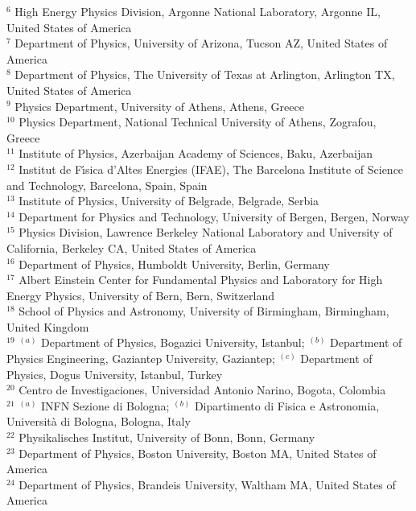 \begin{flushleft}
$^{6}$ High Energy Physics Division, Argonne National Laboratory, Argonne IL, United States of America\\
$^{7}$ Department of Physics, University of Arizona, Tucson AZ, United States of America\\
$^{8}$ Department of Physics, The University of Texas at Arlington, Arlington TX, United States of America\\
$^{9}$ Physics Department, University of Athens, Athens, Greece\\
$^{10}$ Physics Department, National Technical University of Athens, Zografou, Greece\\
$^{11}$ Institute of Physics, Azerbaijan Academy of Sciences, Baku, Azerbaijan\\
$^{12}$ Institut de F{\'\i}sica d'Altes Energies (IFAE), The Barcelona Institute of Science and Technology, Barcelona, Spain, Spain\\
$^{13}$ Institute of Physics, University of Belgrade, Belgrade, Serbia\\
$^{14}$ Department for Physics and Technology, University of Bergen, Bergen, Norway\\
$^{15}$ Physics Division, Lawrence Berkeley National Laboratory and University of California, Berkeley CA, United States of America\\
$^{16}$ Department of Physics, Humboldt University, Berlin, Germany\\
$^{17}$ Albert Einstein Center for Fundamental Physics and Laboratory for High Energy Physics, University of Bern, Bern, Switzerland\\
$^{18}$ School of Physics and Astronomy, University of Birmingham, Birmingham, United Kingdom\\
$^{19}$ $^{(a)}$ Department of Physics, Bogazici University, Istanbul; $^{(b)}$ Department of Physics Engineering, Gaziantep University, Gaziantep; $^{(c)}$ Department of Physics, Dogus University, Istanbul, Turkey\\
$^{20}$ Centro de Investigaciones, Universidad Antonio Narino, Bogota, Colombia\\
$^{21}$ $^{(a)}$ INFN Sezione di Bologna; $^{(b)}$ Dipartimento di Fisica e Astronomia, Universit{\`a} di Bologna, Bologna, Italy\\
$^{22}$ Physikalisches Institut, University of Bonn, Bonn, Germany\\
$^{23}$ Department of Physics, Boston University, Boston MA, United States of America\\
$^{24}$ Department of Physics, Brandeis University, Waltham MA, United States of America\\

\end{flushleft}
